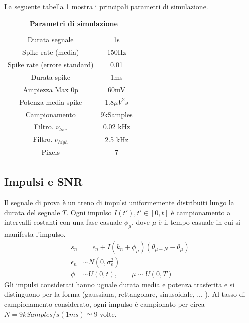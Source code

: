\documentclass[9pt,twocolumn,twoside]{osajnl}
\begin{document}
La seguente tabella \ref{tab:param} mostra i principali parametri di simulazione.

\begin{table}[htbp]
\centering
\caption{\bf Parametri di simulazione}
\begin{tabular}{ccc}
\hline
Durata segnale                  & 1s                \\
Spike rate (media)              & 150Hz             \\
Spike rate (errore standard)    & 0.01              \\
Durata spike                    & 1ms               \\
Ampiezza Max 0p                 & 60mV              \\
Potenza media spike            & 1.8$\mu V^{2}s$   \\
Campionamento                   & 9kSamples         \\
Filtro. $\nu_{low}$             & 0.02 kHz          \\
Filtro. $\nu_{high}$            & 2.5 kHz           \\
Pixels                          & 7                 \\
\hline
\end{tabular}
\label{tab:param}
\end{table}



\subsection{Impulsi e SNR}

Il segnale di prova è un treno di impulsi uniformemente distribuiti lungo la durata del segnale $T$. Ogni impulso $I(t'), t'\in[0,t]$ è campionamento a intervalli costanti con una fase casuale $\phi_{\mu}$, dove $\mu$ è il tempo casuale in cui si manifesta l'impulso.
%
\begin{align*}
 s_{n} &= \epsilon_{n} + I(k_{n} + \phi_{\mu})(\theta_{\mu+N} - \theta_{\mu})    \\
 \epsilon_{n} & \sim N(0,\sigma^{2}_{\epsilon})   \\
 \phi & \sim U(0,t), \quad\quad \mu  \sim  U(0,T )
\end{align*}
%
Gli impulsi considerati hanno uguale durata media e potenza trasferita e si distinguono per la forma (gaussiana, rettangolare, sinusoidale, ... ). Al tasso di campionamento considerato, ogni impulso è campionato per circa $N = 9kSamples/s (1ms) \simeq 9$ volte.
\end{document}
